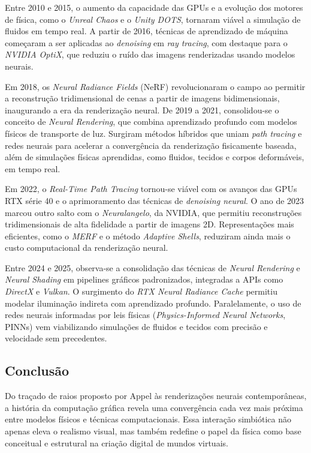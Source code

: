 Entre 2010 e 2015, o aumento da capacidade das GPUs e a evolução dos motores de física, como o \textit{Unreal Chaos} e o \textit{Unity DOTS}, tornaram viável a simulação de fluidos em tempo real. A partir de 2016, técnicas de aprendizado de máquina começaram a ser aplicadas ao \textit{denoising} em \textit{ray tracing}, com destaque para o \textit{NVIDIA OptiX}, que reduziu o ruído das imagens renderizadas usando modelos neurais.

Em 2018, os \textit{Neural Radiance Fields} (NeRF) revolucionaram o campo ao permitir a reconstrução tridimensional de cenas a partir de imagens bidimensionais, inaugurando a era da renderização neural. De 2019 a 2021, consolidou-se o conceito de \textit{Neural Rendering}, que combina aprendizado profundo com modelos físicos de transporte de luz. Surgiram métodos híbridos que uniam \textit{path tracing} e redes neurais para acelerar a convergência da renderização fisicamente baseada, além de simulações físicas aprendidas, como fluidos, tecidos e corpos deformáveis,	 em tempo real.

Em 2022, o \textit{Real-Time Path Tracing} tornou-se viável com os avanços das GPUs RTX série 40 e o aprimoramento das técnicas de \textit{denoising neural}. O ano de 2023 marcou outro salto com o \textit{Neuralangelo}, da NVIDIA, que permitiu reconstruções tridimensionais de alta fidelidade a partir de imagens 2D. Representações mais eficientes, como o \textit{MERF} e o método \textit{Adaptive Shells}, reduziram ainda mais o custo computacional da renderização neural.

Entre 2024 e 2025, observa-se a consolidação das técnicas de \textit{Neural Rendering} e \textit{Neural Shading} em pipelines gráficos padronizados, integradas a APIs como \textit{DirectX} e \textit{Vulkan}. O surgimento do \textit{RTX Neural Radiance Cache} permitiu modelar iluminação indireta com aprendizado profundo. Paralelamente, o uso de redes neurais informadas por leis físicas (\textit{Physics-Informed Neural Networks}, PINNs) vem viabilizando simulações de fluidos e tecidos com precisão e velocidade sem precedentes.

\subsection{Conclusão}

Do traçado de raios proposto por Appel às renderizações neurais contemporâneas, a história da computação gráfica revela uma convergência cada vez mais próxima entre modelos físicos e técnicas computacionais. Essa interação simbiótica não apenas eleva o realismo visual, mas também redefine o papel da física como base conceitual e estrutural na criação digital de mundos virtuais.

